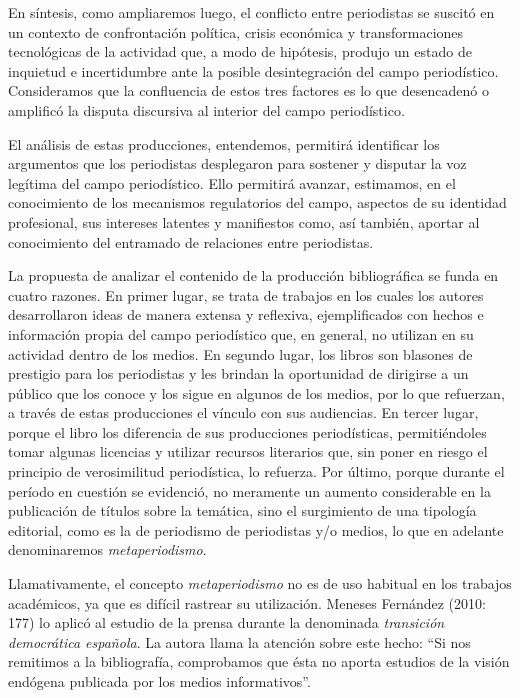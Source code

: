 En síntesis, como ampliaremos luego, el conflicto entre periodistas se suscitó en un contexto de confrontación política, crisis económica y transformaciones tecnológicas de la actividad que, a modo de hipótesis, produjo un estado de inquietud e incertidumbre ante la posible desintegración del campo periodístico. Consideramos que la confluencia de estos tres factores es lo que desencadenó o amplificó la disputa discursiva al interior del campo periodístico.

El análisis de estas producciones, entendemos, permitirá identificar los argumentos que los periodistas desplegaron para sostener y disputar la voz legítima del campo periodístico. Ello permitirá avanzar, estimamos, en el conocimiento de los mecanismos regulatorios del campo, aspectos de su identidad profesional, sus intereses latentes y manifiestos como, así también, aportar al conocimiento del entramado de relaciones entre periodistas.

La propuesta de analizar el contenido de la producción bibliográfica se funda en cuatro razones. En primer lugar, se trata de trabajos en los cuales los autores desarrollaron ideas de manera extensa y reflexiva, ejemplificados con hechos e información propia del campo periodístico que, en general, no utilizan en su actividad dentro de los medios. En segundo lugar, los libros son blasones de prestigio para los periodistas y les brindan la oportunidad de dirigirse a un público que los conoce y los sigue en algunos de los medios, por lo que refuerzan, a través de estas producciones el vínculo con sus audiencias. En tercer lugar, porque el libro los diferencia de sus producciones periodísticas, permitiéndoles tomar algunas licencias y utilizar recursos literarios que, sin poner en riesgo el principio de verosimilitud periodística, lo refuerza. Por último, porque durante el período en cuestión se evidenció, no meramente un aumento considerable en la publicación de títulos sobre la temática, sino el surgimiento de una tipología editorial, como es la de periodismo de periodistas y/o medios, lo que en adelante denominaremos \emph{metaperiodismo}.

Llamativamente, el concepto \emph{metaperiodismo} no es de uso habitual en los trabajos académicos, ya que es difícil rastrear su utilización. Meneses Fernández (2010: 177) lo aplicó al estudio de la prensa durante la denominada \emph{transición democrática española}. La autora llama la atención sobre este hecho: \enquote{Si nos remitimos a la bibliografía, comprobamos que ésta no aporta estudios de la visión endógena publicada por los medios informativos}.

